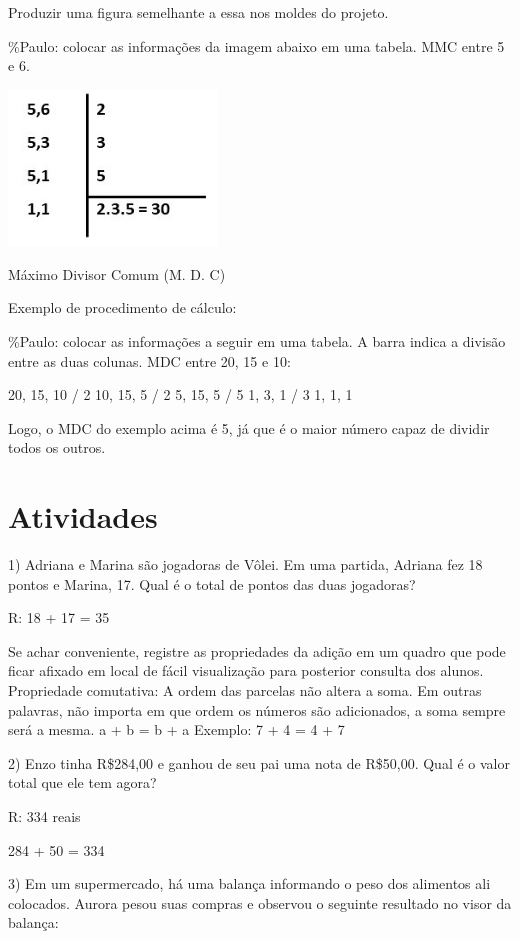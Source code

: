Produzir uma figura semelhante a essa nos moldes do projeto.

\%Paulo: colocar as informações da imagem abaixo em uma tabela. MMC
entre 5 e 6.

\includegraphics[width=2.18605in,height=1.62945in]{./imgSAEB_6_MAT/media/image21.jpeg}

Máximo Divisor Comum (M. D. C)

Exemplo de procedimento de cálculo:

\%Paulo: colocar as informações a seguir em uma tabela. A barra indica a
divisão entre as duas colunas. MDC entre 20, 15 e 10:

20, 15, 10 / 2 10, 15, 5 / 2 5, 15, 5 / 5 1, 3, 1 / 3 1, 1, 1

Logo, o MDC do exemplo acima é 5, já que é o maior número capaz de
dividir todos os outros.

\section{Atividades}

1) Adriana e Marina são jogadoras de Vôlei. Em uma partida, Adriana fez
18 pontos e Marina, 17. Qual é o total de pontos das duas jogadoras?

R: 18 + 17 = 35

Se achar conveniente, registre as propriedades da adição em um quadro
que pode ficar afixado em local de fácil visualização para posterior
consulta dos alunos. Propriedade comutativa: A ordem das parcelas não
altera a soma. Em outras palavras, não importa em que ordem os números
são adicionados, a soma sempre será a mesma. a + b = b + a Exemplo: 7 +
4 = 4 + 7

2) Enzo tinha R\$284,00 e ganhou de seu pai uma nota de R\$50,00. Qual é
o valor total que ele tem agora?

R: 334 reais

284 + 50 = 334

3) Em um supermercado, há uma balança informando o peso dos alimentos
ali colocados. Aurora pesou suas compras e observou o seguinte resultado
no visor da balança:

